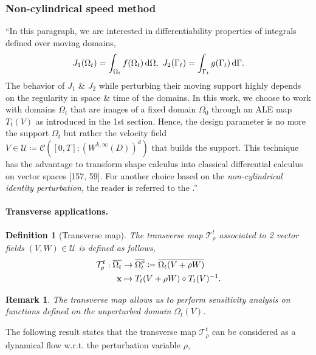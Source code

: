 \documentclass[oneside]{book}
\numberwithin{equation}{section}
\newtheorem{definition}{Definition}[chapter]
\newtheorem{remark}{Remark}[chapter]
\begin{document}
\subsubsection{Non-cylindrical speed method}
``In this paragraph, we are interested in differentiability properties of integrals defined over moving domains,
\begin{align*}
	J_1(\Omega_t) = \int_{\Omega_t} f(\Omega_t)\,{\rm d}\Omega,\ J_2(\Gamma_t) = \int_{\Gamma_t} g(\Gamma_t)\,{\rm d}\Gamma.
\end{align*}
The behavior of $J_1$ \& $J_2$ while perturbing their moving support highly depends on the regularity in space \& time of the domains. In this work, we choose to work with domains $\Omega_t$ that are images of a fixed domain $\Omega_0$ through an ALE map $T_t(V)$ as introduced in the 1st section. Hence, the design parameter is no more the support $\Omega_t$ but rather the velocity field $V\in\mathcal{U}\coloneqq\mathcal{C}([0,T];(W^{k,\infty}(D))^d)$ that builds the support. This technique has the advantage to transform shape calculus into classical differential calculus on vector spaces [157, 59]. For another choice based on the \textit{non-cylindrical identity perturbation}, the reader is referred to the \cite[Chap. 6]{Moubachir_Zolesio2006}.''

\paragraph{Transverse applications.}
\begin{definition}[Transverse map]
	The \emph{transverse map} $\mathcal{T}_\rho^t$ associated to 2 vector fields $(V,W)\in\mathcal{U}$ is defined as follows,
	\begin{align*}
		\mathcal{T}_\rho^t:\overline{\Omega_t}&\to\overline{\Omega_t^\rho}\coloneqq\overline{\Omega_t(V + \rho W)}\\
		{\bf x}&\mapsto T_t(V + \rho W)\circ T_t(V)^{-1}.
	\end{align*}
\end{definition}

\begin{remark}
	The transverse map allows us to perform sensitivity analysis on functions defined on the unperturbed domain $\Omega_t(V)$.
\end{remark}
The following result states that the transverse map $\mathcal{T}_\rho^t$ can be considered as a dynamical flow w.r.t. the perturbation variable $\rho$,
\end{document}
